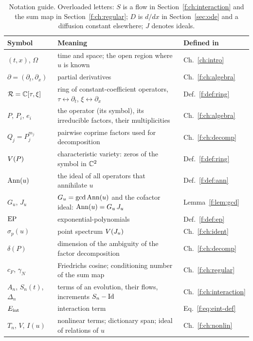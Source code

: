 \begin{table}[!htb]
\centering\small
\begin{tabular}{@{}L{3.1cm}L{8.9cm}L{2.5cm}@{}}
\toprule
Symbol & Meaning & Defined in\\\midrule
$(t,x)$, $\Omega$ & time and space; the open region where $u$ is known & Ch.~\ref{ch:intro}\\
$\partial=(\partial_t,\partial_x)$ & partial derivatives & Ch.~\ref{f:ch:algebra}\\
$\mathcal{R}=\mathbb{C}[\tau,\xi]$ & ring of constant-coefficient operators, $\tau\leftrightarrow\partial_t$, $\xi\leftrightarrow\partial_x$ & Def.~\ref{f:def:ring}\\
$P$, $P_i$, $e_i$ & the operator (its symbol), its irreducible factors, their multiplicities & Ch.~\ref{f:ch:algebra}\\
$Q_j=P_j^{m_j}$ & pairwise coprime factors used for decomposition & Ch.~\ref{f:ch:decomp}\\
$V(P)$ & characteristic variety: zeros of the symbol in $\mathbb{C}^2$ & Def.~\ref{f:def:ring}\\
$\operatorname{Ann}(u)$ & the ideal of all operators that annihilate $u$ & Def.~\ref{f:def:ann}\\
$G_u$, $J_u$ & $G_u=\operatorname{gcd}\operatorname{Ann}(u)$ and the cofactor ideal: $\operatorname{Ann}(u)=G_u\,J_u$ & Lemma~\ref{f:lem:gcd}\\
$\mathrm{EP}$ & exponential-polynomials & Def.~\ref{f:def:ep}\\
$\sigma_p(u)$ & point spectrum $V(J_u)$ & Ch.~\ref{f:ch:ident}\\
$\delta(P)$ & dimension of the ambiguity of the factor decomposition & Ch.~\ref{f:ch:decomp}\\
$c_F$, $\gamma_N$ & Friedrichs cosine; conditioning number of the sum map & Ch.~\ref{f:ch:regular}\\
$A_n$, $S_n(t)$, $\Delta_n$ & terms of an evolution, their flows, increments $S_n-\mathrm{Id}$ & Ch.~\ref{f:ch:interaction}\\
$E_{\mathrm{int}}$ & interaction term & Eq.~\eqref{f:eq:eint-def}\\
$T_n$, $V$, $I(u)$ & nonlinear terms; dictionary span; ideal of relations of $u$ & Ch.~\ref{f:ch:nonlin}\\
\bottomrule
\end{tabular}
\caption{Notation guide. Overloaded letters: $S$ is a flow in Section~\ref{f:ch:interaction} and the sum map in Section~\ref{f:ch:regular}; $D$ is $d/dx$ in Section~\ref{sec:ode} and a diffusion constant elsewhere; $J$ denotes ideals.}\label{tab:notation}
\end{table}

